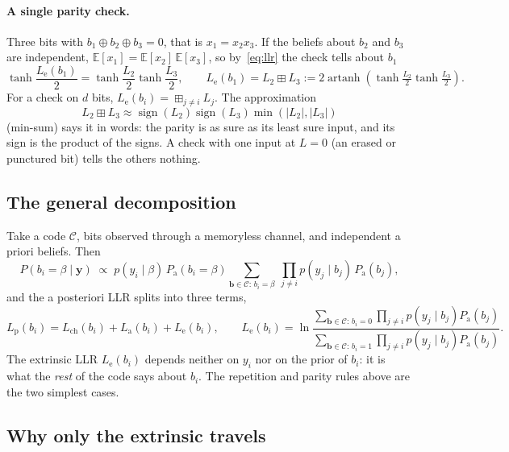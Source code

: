 \documentclass[11pt,a4paper]{article}
\newcommand{\E}{\mathbb{E}}
\newcommand{\Lch}{L_{\mathrm{ch}}}
\newcommand{\La}{L_{\mathrm{a}}}
\newcommand{\Le}{L_{\mathrm{e}}}
\newcommand{\Lp}{L_{\mathrm{p}}}
\DeclareMathOperator{\artanh}{artanh}
\DeclareMathOperator{\sign}{sign}
\theoremstyle{definition}
\theoremstyle{remark}
\begin{document}
\paragraph{A single parity check.} Three bits with $b_1\oplus b_2\oplus b_3 = 0$, that is $x_1 = x_2x_3$. If the beliefs about $b_2$ and $b_3$ are independent, $\E[x_1] = \E[x_2]\,\E[x_3]$, so by~\eqref{eq:llr} the check tells about $b_1$
\begin{equation}
  \tanh\frac{\Le(b_1)}{2} = \tanh\frac{L_2}{2}\tanh\frac{L_3}{2},\qquad
  \Le(b_1) = L_2\boxplus L_3 := 2\artanh\!\left(\tanh\tfrac{L_2}{2}\tanh\tfrac{L_3}{2}\right).
  \label{eq:boxplus}
\end{equation}
For a check on $d$ bits, $\Le(b_i) = \boxplus_{j\ne i} L_j$. The approximation
\begin{equation}
  L_2\boxplus L_3 \approx \sign(L_2)\sign(L_3)\min(|L_2|,|L_3|)
  \label{eq:minsum}
\end{equation}
(min-sum) says it in words: the parity is as sure as its least sure input, and its sign is the product of the signs. A check with one input at $L=0$ (an erased or punctured bit) tells the others nothing.

\subsection{The general decomposition}

Take a code $\mathcal{C}$, bits observed through a memoryless channel, and independent a priori beliefs. Then
\begin{equation}
  P(b_i=\beta\mid \bm{y}) \;\propto\; p(y_i\mid\beta)\,P_{\mathrm{a}}(b_i=\beta)
  \sum_{\bm{b}\in\mathcal{C}:\,b_i=\beta}\ \prod_{j\neq i} p(y_j\mid b_j)\,P_{\mathrm{a}}(b_j),
\end{equation}
and the a posteriori LLR splits into three terms,
\begin{equation}
  \Lp(b_i) = \Lch(b_i) + \La(b_i) + \Le(b_i),\qquad
  \Le(b_i) = \ln\frac{\sum_{\bm{b}\in\mathcal{C}:\,b_i=0}\prod_{j\neq i} p(y_j\mid b_j)P_{\mathrm{a}}(b_j)}{\sum_{\bm{b}\in\mathcal{C}:\,b_i=1}\prod_{j\neq i} p(y_j\mid b_j)P_{\mathrm{a}}(b_j)}.
  \label{eq:decomp}
\end{equation}
The extrinsic LLR $\Le(b_i)$ depends neither on $y_i$ nor on the prior of $b_i$: it is what the \emph{rest} of the code says about $b_i$. The repetition and parity rules above are the two simplest cases.

\subsection{Why only the extrinsic travels}
\end{document}
